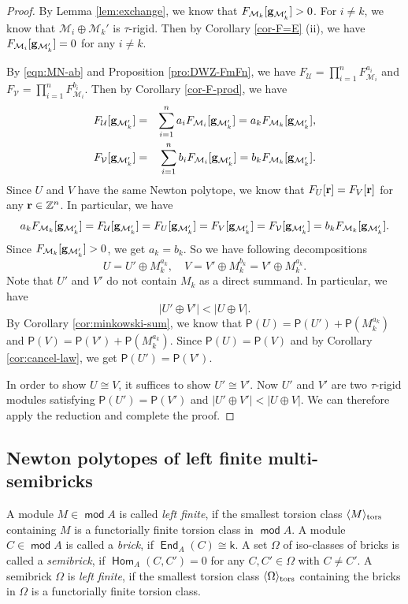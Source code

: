 \documentclass[10pt]{amsart}
\theoremstyle{definition}
\theoremstyle{remark}
\numberwithin{equation}{section}
\def\mod{\opname{mod}\nolimits}
\newcommand{\opname}[1]{\operatorname{\mathsf{#1}}}
\newcommand{\End}{\opname{End}}
\newcommand{\Hom}{\opname{Hom}}
\begin{document}
\begin{proof}
By Lemma \ref{lem:exchange}, we know that $F_{\mathcal M_k}[{\bf g}_{\mathcal M_k'}]>0$.
For $i\neq k$, we know that $\mathcal M_i\oplus \mathcal M_k'$ is $\tau$-rigid. Then by Corollary \ref{cor-F=E} (ii), we have $F_{\mathcal M_i}[{\bf g}_{\mathcal M_k'}]=0$ for any $i\neq k$.

By \eqref{eqn:MN-ab} and Proposition \ref{pro:DWZ-FmFn}, we have $F_{\mathcal U}=\prod_{i=1}^nF_{\mathcal M_i}^{a_i}$ and $F_{\mathcal V}=\prod_{i=1}^nF_{\mathcal M_i}^{b_i}$. Then by Corollary \ref{cor-F-prod}, we have 
\begin{eqnarray*}
 F_{\mathcal U}[{\bf g}_{\mathcal M_k'}]&=&\sum_{i=1}^na_iF_{\mathcal M_i}[{\bf g}_{\mathcal M_k'}] =a_k F_{\mathcal M_k}[{\bf g}_{\mathcal M_k'}],\\ 
 F_{\mathcal V}[{\bf g}_{\mathcal M_k'}]&=&\sum_{i=1}^nb_iF_{\mathcal M_i}[{\bf g}_{\mathcal M_k'}] =b_k F_{\mathcal M_k}[{\bf g}_{\mathcal M_k'}].
\end{eqnarray*}
Since $U$ and $V$ have the same Newton polytope, we know that $F_U[{\bf r}]=F_V[{\bf r}]$ for any ${\bf r}\in\mathbb Z^n$. In particular, we have
\[
a_k F_{\mathcal M_k}[{\bf g}_{\mathcal M_k'}]= F_{\mathcal U}[{\bf g}_{\mathcal M_k'}]= F_{U}[{\bf g}_{\mathcal M_k'}]= F_{V}[{\bf g}_{\mathcal M_k'}]= F_{\mathcal V}[{\bf g}_{\mathcal M_k'}]=b_k F_{\mathcal M_k}[{\bf g}_{\mathcal M_k'}].
\]
Since $F_{\mathcal M_k}[{\bf g}_{\mathcal M_k'}]>0$, we get $a_k=b_k$. So we have 
 following decompositions \[U=U'\oplus M_k^{a_k},\quad V=V'\oplus M_k^{b_k}=V'\oplus M_k^{a_k}.\] Note that $U'$ and $V'$ do not contain $M_k$ as  a direct summand. In particular, we have \[|U'\oplus V'|<|U\oplus V|.\]
By Corollary \ref{cor:minkowski-sum}, we know that $\mathsf P(U)=\mathsf P(U')+\mathsf P(M_k^{a_k})$ and $\mathsf P(V)=\mathsf P(V')+\mathsf P(M_k^{a_k})$. Since $\mathsf P(U)=\mathsf P(V)$ and by Corollary \ref{cor:cancel-law}, we get $\mathsf P(U')=\mathsf P(V')$.

In order to show $U\cong V$, it suffices to show $U'\cong V'$.
Now $U'$ and $V'$ are two $\tau$-rigid modules satisfying  $\mathsf P(U')=\mathsf P(V')$ and $|U'\oplus V'|<|U\oplus V|$. We can therefore apply the reduction and complete the proof.
\end{proof}


\subsection{Newton polytopes of left finite multi-semibricks}
A module $M\in\mod A$ is called {\em left finite}, if the smallest torsion class $\langle M\rangle_{\rm tors }$ containing $M$ is a functorially finite torsion class in $\mod A$. A module $C\in\mod A$ is called a {\em brick}, if $\End_A(C)\cong \mathsf k$.  A set $\Omega$ of iso-classes of bricks is called a {\em semibrick}, if $\Hom_A(C,C')=0$ for any $C,C'\in\Omega$ with $C\neq C'$. A semibrick $\Omega$ is {\em left finite}, if the smallest torsion class $\langle \Omega\rangle_{\rm tors}$ containing the bricks in $\Omega$ is a functorially finite torsion class.
\end{document}
